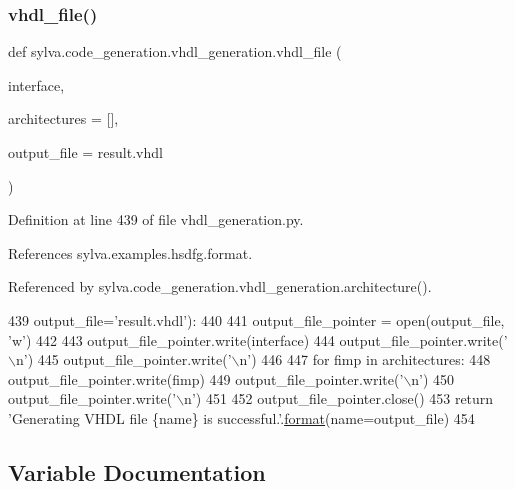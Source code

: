 \subsubsection{\texorpdfstring{vhdl\+\_\+file()}{vhdl\_file()}}
{\footnotesize\ttfamily def sylva.\+code\+\_\+generation.\+vhdl\+\_\+generation.\+vhdl\+\_\+file (\begin{DoxyParamCaption}\item[{}]{interface,  }\item[{}]{architectures = {\ttfamily \mbox{[}\mbox{]}},  }\item[{}]{output\+\_\+file = {\ttfamily \textquotesingle{}result.vhdl\textquotesingle{}} }\end{DoxyParamCaption})}



Definition at line 439 of file vhdl\+\_\+generation.\+py.



References sylva.\+examples.\+hsdfg.\+format.



Referenced by sylva.\+code\+\_\+generation.\+vhdl\+\_\+generation.\+architecture().


\begin{DoxyCode}
439               output\_file=\textcolor{stringliteral}{'result.vhdl'}):
440 
441     output\_file\_pointer = open(output\_file, \textcolor{stringliteral}{'w'})
442 
443     output\_file\_pointer.write(interface)
444     output\_file\_pointer.write(\textcolor{stringliteral}{'\(\backslash\)n'})
445     output\_file\_pointer.write(\textcolor{stringliteral}{'\(\backslash\)n'})
446 
447     \textcolor{keywordflow}{for} fimp \textcolor{keywordflow}{in} architectures:
448         output\_file\_pointer.write(fimp)
449         output\_file\_pointer.write(\textcolor{stringliteral}{'\(\backslash\)n'})
450         output\_file\_pointer.write(\textcolor{stringliteral}{'\(\backslash\)n'})
451 
452     output\_file\_pointer.close()
453     \textcolor{keywordflow}{return} \textcolor{stringliteral}{'Generating VHDL file \{name\} is successful.'}.\hyperlink{namespacesylva_1_1examples_1_1hsdfg_ab3510a0b8457362330aa4d9fd2209590}{format}(name=output\_file)
454 \end{DoxyCode}


\subsection{Variable Documentation}
\mbox{\label{namespacesylva_1_1code__generation_1_1vhdl__generation_a0cf71880063e2c29029ca74b630eec28}} 
